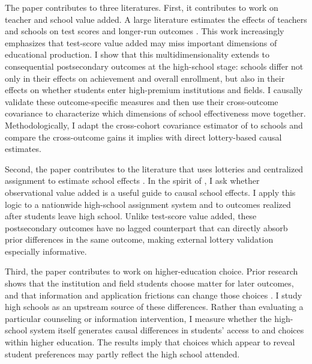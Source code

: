 \documentclass[a4paper, article, english, oneside, unknownkeysallowed, 12pt]{memoir}
\begin{document}
The paper contributes to three literatures.
First, it contributes to work on teacher and school value added.
A large literature estimates the effects of teachers and schools on test scores and longer-run outcomes \parencite{chetty_measuring_2014, dobbie_medium-term_2015, jackson_what_2018, beuermann_what_2023, rose_effects_2022}.
This work increasingly emphasizes that test-score value added may miss important dimensions of educational production.
I show that this multidimensionality extends to consequential postsecondary outcomes at the high-school stage: schools differ not only in their effects on achievement and overall enrollment, but also in their effects on whether students enter high-premium institutions and fields.
I causally validate these outcome-specific measures and then use their cross-outcome covariance to characterize which dimensions of school effectiveness move together.
Methodologically, I adapt the cross-cohort covariance estimator of \textcite{rose_effects_2022} to schools and compare the cross-outcome gains it implies with direct lottery-based causal estimates.
 
Second, the paper contributes to the literature that uses lotteries and centralized assignment to estimate school effects \parencite{abdulkadiroglu_elite_2014, abdulkadiroglu_research_2017, angrist_credible_2024}.
In the spirit of \textcite{angrist_leveraging_2017}, I ask whether observational value added is a useful guide to causal school effects.
I apply this logic to a nationwide high-school assignment system and to outcomes realized after students leave high school.
Unlike test-score value added, these postsecondary outcomes have no lagged counterpart that can directly absorb prior differences in the same outcome, making external lottery validation especially informative.
 
Third, the paper contributes to work on higher-education choice.
Prior research shows that the institution and field students choose matter for later outcomes, and that information and application frictions can change those choices \parencite{kirkeboen_field_2016, hoxby_what_2015, dynarski_closing_2021, hastings_informed_2016, chetty_diversifying_2025}.
I study high schools as an upstream source of these differences.
Rather than evaluating a particular counseling or information intervention, I measure whether the high-school system itself generates causal differences in students' access to and choices within higher education.
The results imply that choices which appear to reveal student preferences may partly reflect the high school attended.
 
\end{document}

